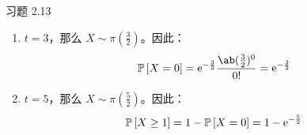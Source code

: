\begin{problem}
    习题 2.13
    \begin{solution}
        \begin{enumerate}
            \item[\textbf{1)}] $t = 3$，那么 $X \sim \pi(\frac{3}{2})$。因此：
            $$
            \prob{X = 0} = \E^{-\frac{3}{2}} \frac{\ab(\frac{3}{2})^{0}}{0!} = \E^{-\frac{3}{2}}
            $$
            \item[\textbf{2)}] $t = 5$，那么 $X \sim \pi(\frac{5}{2})$。因此：
            $$
            \operatorname{\mathbb{P}}\left[X \ge 1\right] = 1 - \operatorname{\mathbb{P}}\left[X = 0\right] = 1 - \mathrm{e}^{-\frac{5}{2}}
            $$
        \end{enumerate}
    \end{solution}
\end{problem}